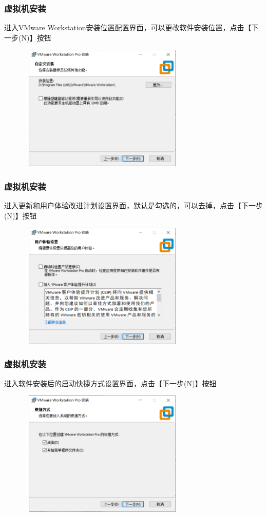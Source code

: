 \documentclass[notheorems,serif]{beamer}
\begin{document}
\begin{frame}
\frametitle{虚拟机安装}
进入VMware Workstation安装位置配置界面，可以更改软件安装位置，点击【下一步(N)】按钮
\begin{figure}
\centering
\includegraphics[width=8cm,height=6cm]{./figures/图片3.png}
\end{figure}
\end{frame}

\begin{frame}
\frametitle{虚拟机安装}
进入更新和用户体验改进计划设置界面，默认是勾选的，可以去掉，点击【下一步(N)】按钮
\begin{figure}
\centering
\includegraphics[width=8cm,height=6cm]{./figures/图片4.png}
\end{figure}
\end{frame}

\begin{frame}
\frametitle{虚拟机安装}
进入软件安装后的启动快捷方式设置界面，点击【下一步(N)】按钮
\begin{figure}
\centering
\includegraphics[width=8cm,height=6cm]{./figures/图片5.png}
\end{figure}
\end{frame}
\end{document}
